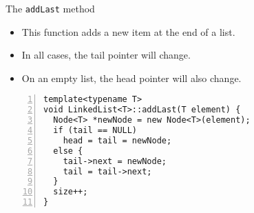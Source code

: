 \documentclass{beamer}
\begin{document}
\begin{frame}[fragile]{The \lstinline$addLast$ method }

\begin{itemize}
\item This function adds a new item at the end of a
list. 

\item In all cases, the tail pointer will change.

\item On an empty list, the head pointer will also
change.

\end{itemize}

\begin{lstlisting}[numbers=left]
template<typename T>
void LinkedList<T>::addLast(T element) {
  Node<T> *newNode = new Node<T>(element);
  if (tail == NULL)
    head = tail = newNode;
  else {
    tail->next = newNode;
    tail = tail->next;
  }
  size++;
}
\end{lstlisting}

\end{frame}

\end{document}
